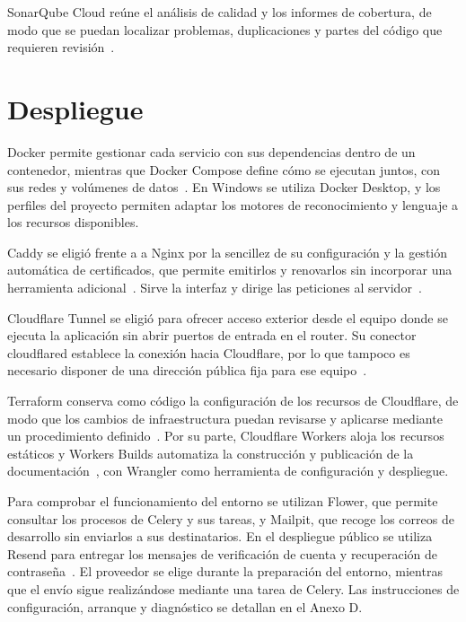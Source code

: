 SonarQube Cloud reúne el análisis de calidad y los informes de cobertura,
de modo que se puedan localizar problemas, duplicaciones y partes del
código que requieren revisión~\cite{sonarqube_cloud_documentacion}.

\section{Despliegue}

Docker permite gestionar cada servicio con sus dependencias dentro de un contenedor, mientras que
Docker Compose define cómo se ejecutan juntos, con sus redes y volúmenes
de datos~\cite{docker_compose_documentacion}. En Windows se utiliza Docker
Desktop, y los perfiles del proyecto permiten adaptar los motores de
reconocimiento y lenguaje a los recursos disponibles.

Caddy se eligió frente a a Nginx por la sencillez de su configuración y la gestión
automática de certificados, que permite emitirlos y renovarlos sin
incorporar una herramienta adicional~\cite{caddy_certificados}. Sirve la
interfaz y dirige las peticiones al servidor~\cite{caddy_proxy_documentacion}.

Cloudflare Tunnel se eligió para ofrecer acceso exterior desde el equipo
donde se ejecuta la aplicación sin abrir puertos de entrada en el router.
Su conector cloudflared establece la conexión hacia Cloudflare, por lo que
tampoco es necesario disponer de una dirección pública fija para ese
equipo~\cite{cloudflare_tunnel}.

Terraform conserva como código la configuración de los recursos de
Cloudflare, de modo que los cambios de infraestructura puedan revisarse y
aplicarse mediante un procedimiento definido~\cite{terraform_introduccion}.
Por su parte, Cloudflare Workers aloja los recursos estáticos y Workers
Builds automatiza la construcción y publicación de la
documentación~\cite{cloudflare_workers_assets,cloudflare_workers_builds},
con Wrangler como herramienta de configuración y despliegue.

Para comprobar el funcionamiento del entorno se utilizan Flower, que
permite consultar los procesos de Celery y sus tareas, y Mailpit, que
recoge los correos de desarrollo sin enviarlos a sus destinatarios.
En el despliegue público se utiliza Resend para entregar los mensajes de
verificación de cuenta y recuperación de contraseña~\cite{resend_smtp}.
El proveedor se elige durante la preparación del entorno, mientras que
el envío sigue realizándose mediante una tarea de Celery. Las instrucciones
de configuración, arranque y diagnóstico se detallan en el Anexo D.

